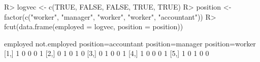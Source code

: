 \begin{Schunk}
% --begin: "fcut.logfact"
\begin{Sinput}
R> logvec <- c(TRUE, FALSE, FALSE, TRUE, TRUE)
R> position <- factor(c("worker", "manager", "worker", "worker", "accountant"))
R> fcut(data.frame(employed = logvec, position = position))
\end{Sinput}
\begin{Soutput}
     employed not.employed position=accountant position=manager position=worker
[1,]        1            0                   0                0               1
[2,]        0            1                   0                1               0
[3,]        0            1                   0                0               1
[4,]        1            0                   0                0               1
[5,]        1            0                   1                0               0
\end{Soutput}
%
% --end: "fcut.logfact"
\end{Schunk}
